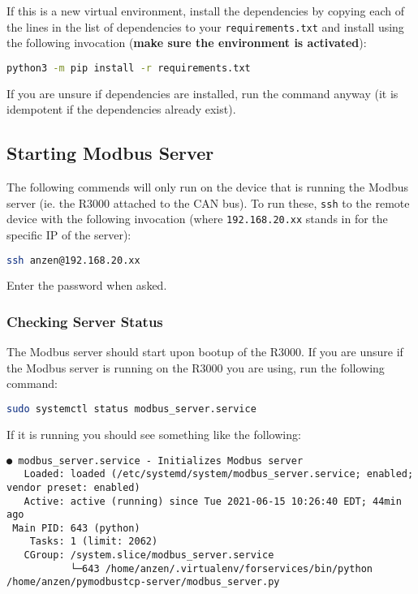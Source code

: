 \documentclass[10pt,]{article}
\newcommand{\passthrough}[1]{#1}
\begin{document}
If this is a new virtual environment, install the dependencies by
copying each of the lines in the list of dependencies to your
\passthrough{\lstinline!requirements.txt!} and install using the
following invocation (\textbf{make sure the environment is activated}):

\begin{lstlisting}[language=bash]
python3 -m pip install -r requirements.txt
\end{lstlisting}

If you are unsure if dependencies are installed, run the command anyway
(it is idempotent if the dependencies already exist).

\hypertarget{starting-modbus-server}{%
\subsection{Starting Modbus Server}\label{starting-modbus-server}}

The following commends will only run on the device that is running the
Modbus server (ie. the R3000 attached to the CAN bus). To run these,
\passthrough{\lstinline!ssh!} to the remote device with the following
invocation (where \passthrough{\lstinline!192.168.20.xx!} stands in for
the specific IP of the server):

\begin{lstlisting}[language=bash]
ssh anzen@192.168.20.xx
\end{lstlisting}

Enter the password when asked.

\hypertarget{checking-server-status}{%
\subsubsection{Checking Server Status}\label{checking-server-status}}

The Modbus server should start upon bootup of the R3000. If you are
unsure if the Modbus server is running on the R3000 you are using, run
the following command:

\begin{lstlisting}[language=bash]
sudo systemctl status modbus_server.service
\end{lstlisting}

If it is running you should see something like the following:

\begin{lstlisting}
● modbus_server.service - Initializes Modbus server
   Loaded: loaded (/etc/systemd/system/modbus_server.service; enabled; vendor preset: enabled)
   Active: active (running) since Tue 2021-06-15 10:26:40 EDT; 44min ago
 Main PID: 643 (python)
    Tasks: 1 (limit: 2062)
   CGroup: /system.slice/modbus_server.service
           └─643 /home/anzen/.virtualenv/forservices/bin/python /home/anzen/pymodbustcp-server/modbus_server.py
\end{lstlisting}
\end{document}
